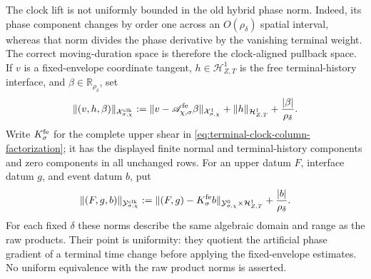 \begin{corollary}
The clock lift is not uniformly bounded in the old hybrid phase norm.
Indeed, its phase component changes by order one across an
\(O(\rho_\delta)\) spatial interval, whereas that norm divides the phase
derivative by the vanishing terminal weight.  The correct moving-duration
space is therefore the clock-aligned pullback space.  If \(v\) is a
fixed-envelope coordinate tangent, \(h\in\mathcal H_{Z,T}^1\) is the free
terminal-history interface, and \(\beta\in\mathbb R_{\rho_\delta}\), set
\begin{equation}
 \|(v,h,\beta)\|_{\mathcal X_{\sigma,\chi}^{\rm clk}}
 :=\|v-\mathscr A_{\chi,\sigma}^{\rm fe}\beta\|_
          {\mathcal X_{\sigma,\chi}^1}
   +\|h\|_{\mathcal H_{Z,T}^1}
   +\frac{|\beta|}{\rho_\delta}.                \label{eq:slow-clock-aligned-domain-norm}
\end{equation}
Write \(K_\sigma^{\rm fe}\) for the complete upper shear in
\cref{eq:terminal-clock-column-factorization}; it has the displayed
finite normal and terminal-history components and zero components in all
unchanged rows.  For an upper datum \(F\), interface datum \(g\), and
event datum \(b\), put
\begin{equation}
 \|(F,g,b)\|_{\mathcal Y_{\sigma,\chi}^{\rm clk}}
 :=\|(F,g)-K_\sigma^{\rm fe}b\|_
          {\mathcal Y_{\sigma,\chi}^0\times\mathcal H_{Z,T}^1}
   +\frac{|b|}{\rho_\delta}.                    \label{eq:slow-clock-aligned-range-norm}
\end{equation}
For each fixed \(\delta\) these norms describe the same algebraic domain
and range as the raw products.  Their point is uniformity: they quotient
the artificial phase gradient of a terminal time change before applying
the fixed-envelope estimates.  No uniform equivalence with the raw
product norms is asserted.


\end{corollary}
